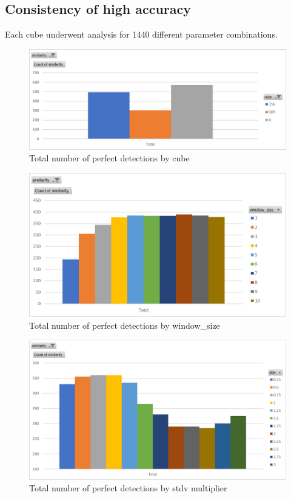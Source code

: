 \subsection{Consistency of high accuracy}
Each cube underwent analysis for 1440 different parameter combinations.

\begin{figure}[h]
    \centering
    \caption{Total number of perfect detections by cube}
    \label{fig:perfect-detections-by-cube}
    \includegraphics[width=0.75\linewidth]{Figures/7 Evaluation/perfect_detections_by_cube.png}
\end{figure}

\begin{figure}[h]
    \centering
    \caption{Total number of perfect detections by window\_size}
    \label{fig:perfect-detections-by-window-size}
    \includegraphics[width=0.75\linewidth]{Figures/7 Evaluation/perfect_detections_by_window_size.png}
\end{figure}

\begin{figure}[h]
    \centering
    \caption{Total number of perfect detections by stdv multiplier}
    \label{fig:perfect-detections-by-stdv}
    \includegraphics[width=0.75\linewidth]{Figures/7 Evaluation/perfect_detections_by_stdv.png}
\end{figure}

